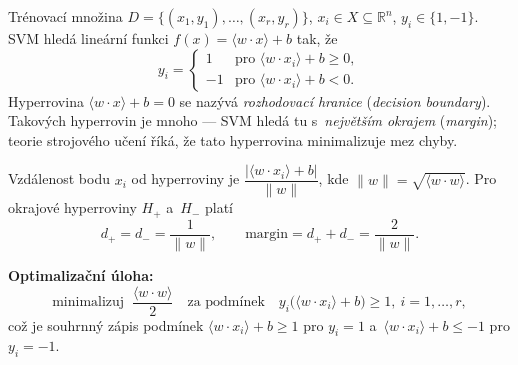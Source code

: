 \documentclass[11pt,a4paper]{article}
\theoremstyle{definition}
\begin{document}
\begin{defbox}
Trénovací množina $D=\{(x_1,y_1),\dots,(x_r,y_r)\}$, $x_i\in X\subseteq\mathbb R^n$,
$y_i\in\{1,-1\}$. SVM hledá lineární funkci $f(x)=\langle w\cdot x\rangle+b$ tak, že
\[ y_i=\begin{cases}1 & \text{pro }\langle w\cdot x_i\rangle+b\ge 0,\\
-1 & \text{pro }\langle w\cdot x_i\rangle+b<0.\end{cases} \]
Hyperrovina $\langle w\cdot x\rangle+b=0$ se nazývá \emph{rozhodovací hranice}
(\emph{decision boundary}). Takových hyperrovin je mnoho --- SVM hledá tu s~\emph{největším
okrajem} (\emph{margin}); teorie strojového učení říká, že tato hyperrovina minimalizuje
mez chyby.

Vzdálenost bodu $x_i$ od hyperroviny je $\dfrac{|\langle w\cdot x_i\rangle+b|}{\|w\|}$, kde
$\|w\|=\sqrt{\langle w\cdot w\rangle}$. Pro okrajové hyperroviny $H_+$ a~$H_-$ platí
\[ d_+=d_-=\frac{1}{\|w\|},\qquad \text{margin}=d_++d_-=\frac{2}{\|w\|}. \]

\textbf{Optimalizační úloha:}
\[ \text{minimalizuj }\ \frac{\langle w\cdot w\rangle}{2}
   \quad\text{za podmínek}\quad y_i\big(\langle w\cdot x_i\rangle+b\big)\ge 1,\
   i=1,\dots,r, \]
což je souhrnný zápis podmínek $\langle w\cdot x_i\rangle+b\ge 1$ pro $y_i=1$
a~$\langle w\cdot x_i\rangle+b\le -1$ pro $y_i=-1$.
\end{defbox}
\end{document}
